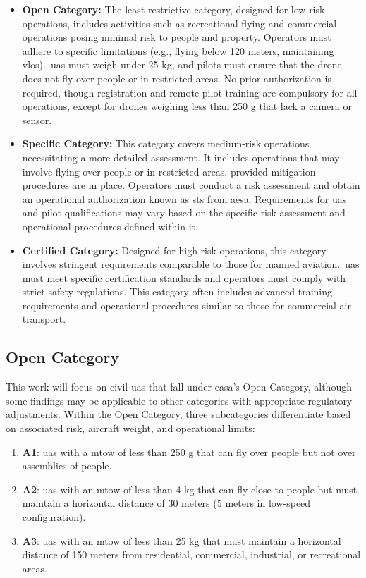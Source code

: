 \begin{itemize}
  \item \textbf{Open Category:} The least restrictive category, designed for low-risk operations, includes activities such as recreational flying and commercial operations posing minimal risk to people and property. Operators must adhere to specific limitations (e.g., flying below 120 meters, maintaining \gls{vlos}).\ \gls{uas} must weigh under 25 kg, and pilots must ensure that the drone does not fly over people or in restricted areas. No prior authorization is required, though registration and remote pilot training are compulsory for all operations, except for drones weighing less than 250 g that lack a camera or sensor.

  \item \textbf{Specific Category:} This category covers medium-risk operations necessitating a more detailed assessment. It includes operations that may involve flying over people or in restricted areas, provided mitigation procedures are in place. Operators must conduct a risk assessment and obtain an operational authorization known as \gls{sts} from \gls{aesa}. Requirements for \gls{uas} and pilot qualifications may vary based on the specific risk assessment and operational procedures defined within it.

  \item \textbf{Certified Category:} Designed for high-risk operations, this category involves stringent requirements comparable to those for manned aviation.\ \gls{uas} must meet specific certification standards and operators must comply with strict safety regulations. This category often includes advanced training requirements and operational procedures similar to those for commercial air transport.
\end{itemize}

\subsection{Open Category}
This work will focus on civil \gls{uas} that fall under \gls{easa}'s Open Category, although some findings may be applicable to other categories with appropriate regulatory adjustments. Within the Open Category, three subcategories differentiate based on associated risk, aircraft weight, and operational limits:

\begin{enumerate}
  \item \textbf{A1}: \gls{uas} with a \gls{mtow} of less than 250 g that can fly over people but not over assemblies of people.

  \item \textbf{A2}: \gls{uas} with an \gls{mtow} of less than 4 kg that can fly close to people but must maintain a horizontal distance of 30 meters (5 meters in low-speed configuration).

  \item \textbf{A3}: \gls{uas} with an \gls{mtow} of less than 25 kg that must maintain a horizontal distance of 150 meters from residential, commercial, industrial, or recreational areas.
\end{enumerate}

